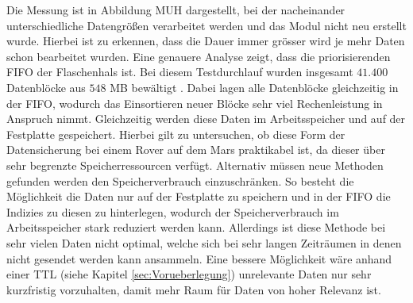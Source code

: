 Die Messung ist in Abbildung MUH dargestellt, bei der nacheinander
unterschiedliche Datengrößen verarbeitet werden und das Modul nicht neu erstellt
wurde. Hierbei ist zu erkennen, dass die Dauer immer grösser wird
je mehr Daten schon bearbeitet wurden. Eine genauere Analyse zeigt, dass die
priorisierenden \gls{FIFO} der Flaschenhals ist. Bei diesem Testdurchlauf
wurden insgesamt $41.400$ Datenblöcke aus $548$ MB bewältigt .
Dabei lagen alle Datenblöcke gleichzeitig in der \gls{FIFO}, wodurch das Einsortieren neuer
Blöcke sehr viel Rechenleistung in Anspruch nimmt. Gleichzeitig werden diese
Daten im Arbeitsspeicher und auf der Festplatte gespeichert. Hierbei gilt zu
untersuchen, ob diese Form der Datensicherung bei einem Rover auf dem
Mars praktikabel ist, da dieser über sehr begrenzte Speicherressourcen verfügt.
Alternativ müssen neue Methoden gefunden werden den Speicherverbrauch
einzuschränken. So besteht die Möglichkeit die Daten nur auf der Festplatte
zu speichern und in der \gls{FIFO} die Indizies zu diesen zu hinterlegen,
wodurch der Speicherverbrauch im Arbeitsspeicher stark reduziert werden kann.
Allerdings ist diese Methode bei sehr vielen Daten nicht optimal, welche sich
bei sehr langen Zeiträumen in denen nicht gesendet werden kann ansammeln.
Eine bessere Möglichkeit wäre anhand einer \gls{TTL} (siehe Kapitel
\ref{sec:Vorueberlegung}) unrelevante Daten nur sehr kurzfristig vorzuhalten, damit mehr Raum für Daten
von hoher Relevanz ist.
